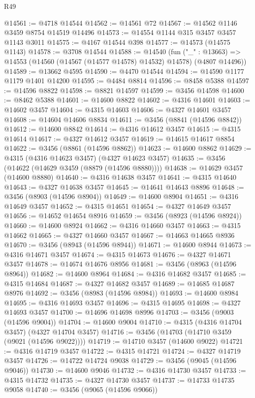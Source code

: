\begin{lexlean}{R49}
\begin{coremodule}
@14561 := @4718 @14544
@14562 := @14561 @72
@14567 := @14562 @1146 @3459 @8754 @14519 @14496
@14573 := @14554 @1144 @315 @3457 @3457 @1143 @3011
@14575 := @4167 @14544 @398
@14577 := @14573 (@14575 @1143)
@14578 := @3708 @14544
@14588 := @14540
    (fun ("_" : @13663) => @14553 (@14560 (@14567 (@14577 @14578) @14532) @14578) (@4807 @14496))
@14589 := @13662 @4595
@14590 := @4470 @14544
@14594 := @14590 @1177 @1179 @1401 @14200
@14595 := @4484 @8814
@14596 := @8458 @5388
@14597 := @14596 @8822
@14598 := @8821 @14597
@14599 := @3456 @14598
@14600 := @8462 @5388
@14601 := @14600 @8822
@14602 := @4316 @14601
@14603 := @14602 @3457
@14604 := @4315 @14603
@14606 := @4327 @14601 @3457
@14608 := @14604 @14606 @8834
@14611 := @3456 (@8841 (@14596 @8842))
@14612 := @14600 @8842
@14614 := @4316 @14612 @3457
@14615 := @4315 @14614
@14617 := @4327 @14612 @3457
@14619 := @14615 @14617 @8854
@14622 := @3456 (@8861 (@14596 @8862))
@14623 := @14600 @8862
@14629 := @4315 (@4316 @14623 @3457) (@4327 @14623 @3457)
@14635 := @3456 (@14622 (@14629 @3459 (@8879 (@14596 @8880))))
@14638 := @14629 @3457 (@14600 @8880)
@14640 := @4316 @14638 @3457
@14641 := @4315 @14640
@14643 := @4327 @14638 @3457
@14645 := @14641 @14643 @8896
@14648 := @3456 (@8903 (@14596 @8904))
@14649 := @14600 @8904
@14651 := @4316 @14649 @3457
@14652 := @4315 @14651
@14654 := @4327 @14649 @3457
@14656 := @14652 @14654 @8916
@14659 := @3456 (@8923 (@14596 @8924))
@14660 := @14600 @8924
@14662 := @4316 @14660 @3457
@14663 := @4315 @14662
@14665 := @4327 @14660 @3457
@14667 := @14663 @14665 @8936
@14670 := @3456 (@8943 (@14596 @8944))
@14671 := @14600 @8944
@14673 := @4316 @14671 @3457
@14674 := @4315 @14673
@14676 := @4327 @14671 @3457
@14678 := @14674 @14676 @8956
@14681 := @3456 (@8963 (@14596 @8964))
@14682 := @14600 @8964
@14684 := @4316 @14682 @3457
@14685 := @4315 @14684
@14687 := @4327 @14682 @3457
@14689 := @14685 @14687 @8976
@14692 := @3456 (@8983 (@14596 @8984))
@14693 := @14600 @8984
@14695 := @4316 @14693 @3457
@14696 := @4315 @14695
@14698 := @4327 @14693 @3457
@14700 := @14696 @14698 @8996
@14703 := @3456 (@9003 (@14596 @9004))
@14704 := @14600 @9004
@14710 := @4315 (@4316 @14704 @3457) (@4327 @14704 @3457)
@14716 := @3456 (@14703 (@14710 @3459 (@9021 (@14596 @9022))))
@14719 := @14710 @3457 (@14600 @9022)
@14721 := @4316 @14719 @3457
@14722 := @4315 @14721
@14724 := @4327 @14719 @3457
@14726 := @14722 @14724 @9038
@14729 := @3456 (@9045 (@14596 @9046))
@14730 := @14600 @9046
@14732 := @4316 @14730 @3457
@14733 := @4315 @14732
@14735 := @4327 @14730 @3457
@14737 := @14733 @14735 @9058
@14740 := @3456 (@9065 (@14596 @9066))

\end{coremodule}
\end{lexlean}
